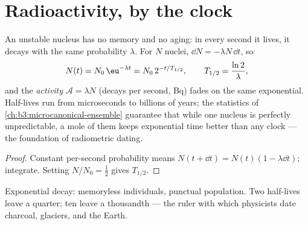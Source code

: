 \section{Radioactivity, by the clock}

\begin{theorem}\label{thm:b3:nuclear-physics:decay}
An unstable nucleus has no memory and no aging: in every second it
lives, it decays with the same probability $\lambda$. For $N$
nuclei, $\dd N = -\lambda N\,\dd t$, so
\[
N(t) = N_0\,\eu^{-\lambda t} = N_0\,2^{-t/T_{1/2}} ,
\qquad T_{1/2} = \frac{\ln2}{\lambda} ,
\]
and the \emph{activity} $\mathcal A = \lambda N$ (decays per
second, \unit{Bq}) fades on the same exponential. Half-lives run
from microseconds to billions of years; the statistics of
\cref{ch:b3:microcanonical-ensemble} guarantee that while one
nucleus is perfectly unpredictable, a mole of them keeps
exponential time better than any clock --- the foundation of
radiometric dating.
\end{theorem}

\begin{proof}
Constant per-second probability means $N(t + \dd t) = N(t)(1 -
\lambda\dd t)$; integrate. Setting $N/N_0 = \tfrac12$ gives
$T_{1/2}$.
\end{proof}

\begin{omfigure}

{\small Exponential decay: memoryless individuals, punctual
population. Two half-lives leave a quarter; ten leave a
thousandth --- the ruler with which physicists date charcoal,
glaciers, and the Earth.}
\end{omfigure}

